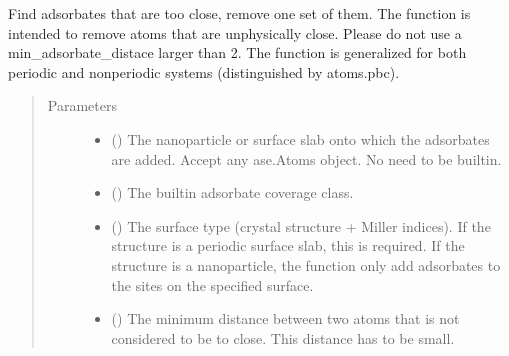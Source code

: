 \documentclass[letterpaper,10pt,english]{sphinxmanual}
\begin{document}
\begin{fulllineitems}
\label{\detokenize{build:acat.build.actions.remove_adsorbates_too_close}}
Find adsorbates that are too close, remove one set of them.
The function is intended to remove atoms that are unphysically
close. Please do not use a min\_adsorbate\_distace larger than 2.
The function is generalized for both periodic and non\sphinxhyphen{}periodic
systems (distinguished by atoms.pbc).
\begin{quote}\begin{description}
\item[{Parameters}] \leavevmode\begin{itemize}
\item {} 
 () \textendash{} The nanoparticle or surface slab onto which the adsorbates are
added. Accept any ase.Atoms object. No need to be built\sphinxhyphen{}in.

\item {} 
 (\sphinxstyleliteralemphasis{\sphinxupquote{,         }}) \textendash{} The built\sphinxhyphen{}in adsorbate coverage class.

\item {} 
 (\sphinxstyleliteralemphasis{\sphinxupquote{, }}) \textendash{} The surface type (crystal structure + Miller indices).
If the structure is a periodic surface slab, this is required.
If the structure is a nanoparticle, the function only add
adsorbates to the sites on the specified surface.

\item {} 
 (\sphinxstyleliteralemphasis{\sphinxupquote{, }}) \textendash{} The minimum distance between two atoms that is not considered to
be to close. This distance has to be small.

\end{itemize}

\end{description}\end{quote}

\end{fulllineitems}
\end{document}
